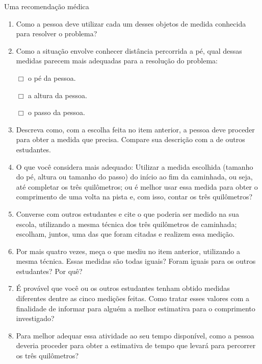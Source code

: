 \begin{task}{Uma recomendação médica}
\begin{enumerate}
\item {} 
Como a pessoa deve utilizar cada um desses objetos de medida conhecida para resolver o problema?

\item {} 
Como a situação envolve conhecer distância percorrida a pé, qual dessas medidas parecem mais adequadas para a resolução do problema:

$\Box$ o pé da pessoa.

$\Box$ a altura da pessoa.

$\Box$ o passo da pessoa.

\item {} 
Descreva como, com a escolha feita no item anterior, a pessoa deve proceder para obter a medida que precisa. Compare sua descrição com a de outros estudantes.

\item {} 
O que você considera mais adequado: Utilizar a medida escolhida (tamanho do pé, altura ou tamanho do passo) do início ao fim da caminhada, ou seja, até completar os três quilômetros; ou é melhor usar essa medida para obter o comprimento de uma volta na pista e, com isso, contar os três quilômetros?

\item {} 
Converse com outros estudantes e cite o que poderia ser medido na sua escola, utilizando a mesma técnica dos três quilômetros de caminhada; escolham, juntos, uma das que foram citadas e realizem essa medição.

\item {} 
Por mais quatro vezes, meça o que mediu no item anterior, utilizando a mesma técnica. Essas medidas são todas iguais? Foram iguais para os outros estudantes? Por quê?

\item {} 
É provável que você ou os outros estudantes tenham obtido medidas diferentes dentre as cinco medições feitas. Como tratar esses valores com a finalidade de informar para alguém a melhor estimativa para o comprimento investigado?

\item {} 
Para melhor adequar essa atividade ao seu tempo disponível, como a pessoa deveria proceder para obter a estimativa de tempo que levará para percorrer os três quilômetros?

\end{enumerate}
\end{task}


